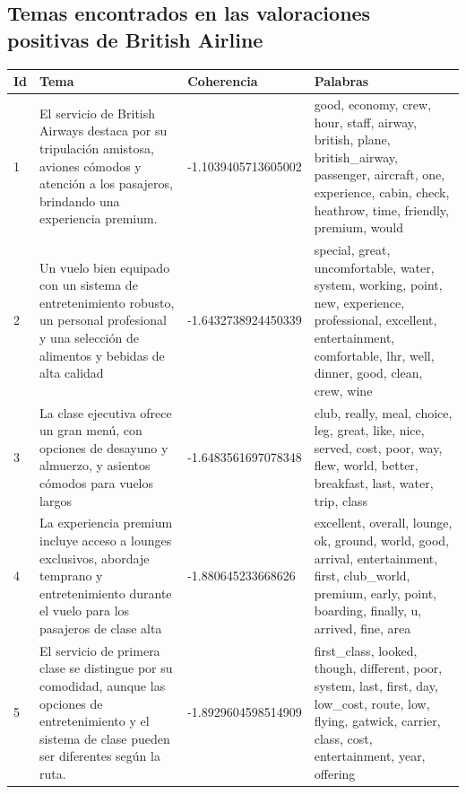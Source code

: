 \documentclass{report}
\begin{document}
{            \clearpage\subsection{Temas encontrados en las valoraciones positivas de British Airline}
                \label{tab:temas_british_airline_positivas}
                \begin{longtable}{|p{1cm}|p{4cm}|p{4cm}|p{6cm}|}
                    \hline
                    \textbf{Id} & \textbf{Tema} & \textbf{Coherencia} & \textbf{Palabras} \\
                    \hline
                    1 & El servicio de British Airways destaca por su tripulación amistosa, aviones cómodos y atención a los pasajeros, brindando una experiencia premium. & -1.1039405713605002 & good, economy, crew, hour, staff, airway, british, plane, british\_airway, passenger, aircraft, one, experience, cabin, check, heathrow, time, friendly, premium, would \\
                    \hline
                    2 & Un vuelo bien equipado con un sistema de entretenimiento robusto, un personal profesional y una selección de alimentos y bebidas de alta calidad & -1.6432738924450339 & special, great, uncomfortable, water, system, working, point, new, experience, professional, excellent, entertainment, comfortable, lhr, well, dinner, good, clean, crew, wine \\
                    \hline
                    3 & La clase ejecutiva ofrece un gran menú, con opciones de desayuno y almuerzo, y asientos cómodos para vuelos largos & -1.6483561697078348 & club, really, meal, choice, leg, great, like, nice, served, cost, poor, way, flew, world, better, breakfast, last, water, trip, class \\
                    \hline
                    4 & La experiencia premium incluye acceso a lounges exclusivos, abordaje temprano y entretenimiento durante el vuelo para los pasajeros de clase alta & -1.880645233668626 & excellent, overall, lounge, ok, ground, world, good, arrival, entertainment, first, club\_world, premium, early, point, boarding, finally, u, arrived, fine, area \\
                    \hline
                    5 & El servicio de primera clase se distingue por su comodidad, aunque las opciones de entretenimiento y el sistema de clase pueden ser diferentes según la ruta. & -1.8929604598514909 & first\_class, looked, though, different, poor, system, last, first, day, low\_cost, route, low, flying, gatwick, carrier, class, cost, entertainment, year, offering \\

\end{longtable}}
\end{document}
